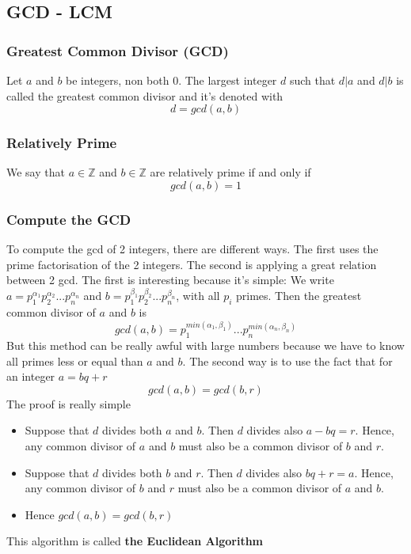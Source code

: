 \documentclass{article}
\begin{document}
\subsection{GCD - LCM}
\subsubsection{Greatest Common Divisor (GCD)} Let $ a $ and $ b $ be integers, non both 0. The largest integer $ d $ such that $ d|a $ and $ d|b $ is called the greatest common divisor and it's denoted with
\begin{equation}
d = gcd(a,b)
\end{equation}

\subsubsection{Relatively Prime} We say that $ a \in \mathbb{Z} $ and $ b \in \mathbb{Z} $ are relatively prime if and only if
\begin{equation}
gcd(a,b) = 1
\end{equation}

\subsubsection{Compute the GCD} To compute the gcd of 2 integers, there are different ways. The first uses the prime factorisation of the 2 integers. The second is applying a great relation between 2 gcd. The first is interesting because it's simple: We write $ a = p_{1}^{\alpha_1}p_{2}^{\alpha_2}...p_{n}^{\alpha_n} $ and $ b = p_{1}^{\beta_1}p_{2}^{\beta_2}...p_{n}^{\beta_n} $, with all $ p_i $ primes. Then the greatest common divisor of $ a $ and $ b $ is
\begin{equation}
gcd(a,b) = p_{1}^{min(\alpha_1,\beta_1)}...p_{n}^{min(\alpha_n,\beta_n)}
\end{equation}
But this method can be really awful with large numbers because we have to know all primes less or equal than $ a $ and $ b $. The second way is to use the fact that for an integer $ a = bq + r $
\begin{equation}
gcd(a,b) = gcd(b,r)
\end{equation} 
The proof is really simple

\begin{tcolorbox}
\begin{itemize}
\item Suppose that $ d $ divides both $ a $ and $ b $. Then $ d $ divides also $ a - bq = r $. Hence, any common divisor of $ a $ and $ b $ must also be a common divisor of $ b $ and $ r $.
\item Suppose that $ d $ divides both $ b $ and $ r $. Then $ d $ divides also $ bq + r = a $. Hence, any common divisor of $ b $ and $ r $ must also be a common divisor of $ a $ and $ b $.
\item Hence $ gcd(a,b) = gcd(b,r) $
\end{itemize}
\end{tcolorbox}
This algorithm is called \textbf{the Euclidean Algorithm}
\end{document}
